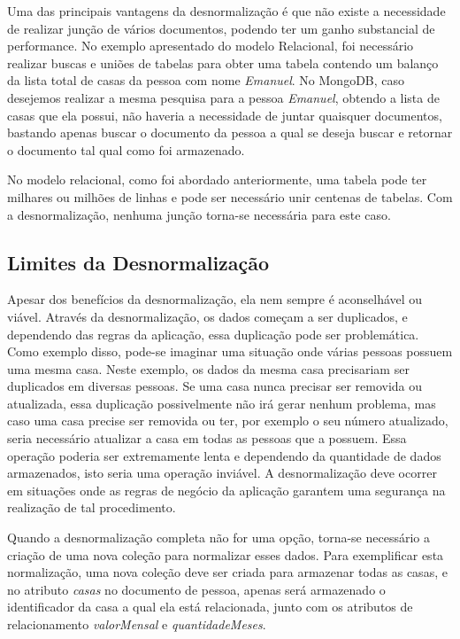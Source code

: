 Uma das principais vantagens da desnormalização é que não existe a necessidade de realizar junção de vários documentos, podendo ter um ganho substancial de performance. No exemplo apresentado do modelo Relacional, foi necessário realizar buscas e uniões de tabelas para obter uma tabela contendo um balanço da lista total de casas da pessoa com nome \textit{Emanuel}. No MongoDB, caso desejemos realizar a mesma pesquisa para a pessoa \textit{Emanuel}, obtendo a lista de casas que ela possui, não haveria a necessidade de juntar quaisquer documentos, bastando apenas buscar o documento da pessoa a qual se deseja buscar e retornar o documento tal qual como foi armazenado.
    
No modelo relacional, como foi abordado anteriormente, uma tabela pode ter milhares ou milhões de linhas e pode ser necessário unir centenas de tabelas. Com a desnormalização, nenhuma junção torna-se necessária para este caso.

\subsection{Limites da Desnormalização}
    
Apesar dos benefícios da desnormalização, ela nem sempre é aconselhável ou viável. Através da desnormalização, os dados começam a ser duplicados, e dependendo das regras da aplicação, essa duplicação pode ser problemática. Como exemplo disso, pode-se imaginar uma situação onde várias pessoas possuem uma mesma casa. Neste exemplo, os dados da mesma casa precisariam ser duplicados em diversas pessoas. Se uma casa nunca precisar ser removida ou atualizada, essa duplicação possivelmente não irá gerar nenhum problema, mas caso uma casa precise ser removida ou ter, por exemplo o seu número atualizado, seria necessário atualizar a casa em todas as pessoas que a possuem. Essa operação poderia ser extremamente lenta e dependendo da quantidade de dados armazenados, isto seria uma operação inviável. A desnormalização deve ocorrer em situações onde as regras de negócio da aplicação garantem uma segurança na realização de tal procedimento.
    
Quando a desnormalização completa não for uma opção, torna-se necessário a criação de uma nova coleção para normalizar esses dados. Para exemplificar esta normalização, uma nova coleção deve ser criada para armazenar todas as casas, e no atributo \textit{casas} no documento de pessoa, apenas será armazenado o identificador da casa a qual ela está relacionada, junto com os atributos de relacionamento \textit{valorMensal} e \textit{quantidadeMeses}.

